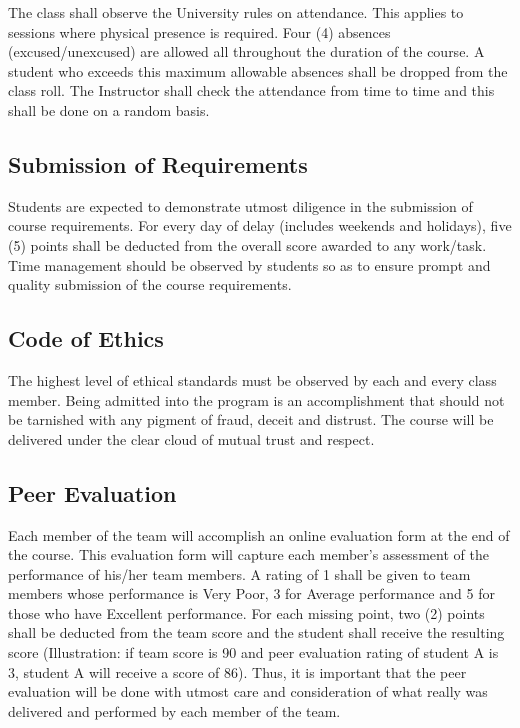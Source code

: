 The class shall observe the University rules on attendance. This applies
to sessions where physical presence is required. Four (4) absences
(excused/unexcused) are allowed all throughout the duration of the
course. A student who exceeds this maximum allowable absences shall be
dropped from the class roll. The Instructor shall check the attendance
from time to time and this shall be done on a random basis.

\hypertarget{submission-of-requirements}{%
\subsection{Submission of
Requirements}\label{submission-of-requirements}}

Students are expected to demonstrate utmost diligence in the submission
of course requirements. For every day of delay (includes weekends and
holidays), five (5) points shall be deducted from the overall score
awarded to any work/task. Time management should be observed by students
so as to ensure prompt and quality submission of the course
requirements.

\hypertarget{code-of-ethics}{%
\subsection{Code of Ethics}\label{code-of-ethics}}

The highest level of ethical standards must be observed by each and
every class member. Being admitted into the program is an accomplishment
that should not be tarnished with any pigment of fraud, deceit and
distrust. The course will be delivered under the clear cloud of mutual
trust and respect.

\hypertarget{peer-evaluation}{%
\subsection{Peer Evaluation}\label{peer-evaluation}}

Each member of the team will accomplish an online evaluation form at the
end of the course. This evaluation form will capture each member's
assessment of the performance of his/her team members. A rating of 1
shall be given to team members whose performance is Very Poor, 3 for
Average performance and 5 for those who have Excellent performance. For
each missing point, two (2) points shall be deducted from the team score
and the student shall receive the resulting score (Illustration: if team
score is 90 and peer evaluation rating of student A is 3, student A will
receive a score of 86). Thus, it is important that the peer evaluation
will be done with utmost care and consideration of what really was
delivered and performed by each member of the team.

